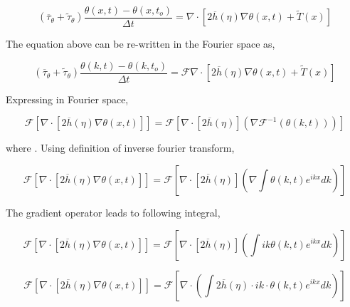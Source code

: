 \documentclass[a4paper,11pt,dvipsnames]{article}
\begin{document}
\begin{equation}
\left ( \overline{\tau}_\theta + \tilde{\tau}_\theta \right ) \frac{\theta (x,t) - \theta (x,t_o)}{\Delta t} = \nabla \cdot \left [ 2 \overline{h}(\eta) \nabla \theta (x,t) + \tilde{T} (x) \right ] \label{eq:3}
\end{equation}

The equation above can be re-written in the Fourier space as,

\begin{equation}
\left ( \overline{\tau}_\theta + \tilde{\tau}_\theta \right ) \frac{\theta (k,t) - \theta (k,t_o)}{\Delta t} = \mathcal{F} \nabla \cdot \left [ 2 \overline{h}(\eta) \nabla \theta (x,t) + \tilde{T} (x) \right ] \label{eq:4}
\end{equation}

Expressing  in Fourier space,  

\begin{equation}
\mathcal{F} \left [ \nabla \cdot \left [ 2 \overline{h}(\eta) \nabla \theta (x,t) \right ] \right ] = 
\mathcal{F} \left [ \nabla \cdot \left [ 2 \overline{h}(\eta) \right ] \left ( \nabla \mathcal{F}^{-1} \left (\theta (k,t) \right ) \right ) \right ] \label{eq:5}
\end{equation}

where . 
Using definition of inverse fourier transform, 

\begin{equation}
\mathcal{F} \left [ \nabla \cdot \left [ 2 \overline{h}(\eta) \nabla \theta (x,t) \right ] \right ] = 
\mathcal{F} \left [ \nabla \cdot \left [ 2 \overline{h}(\eta) \right ] \left ( \nabla \int \theta (k,t) e^{ikx} dk \right ) \right ] \label{eq:6}
\end{equation}

The gradient operator leads to following integral, 

\begin{equation}
\mathcal{F} \left [ \nabla \cdot \left [ 2 \overline{h}(\eta) \nabla \theta (x,t) \right ] \right ] = 
\mathcal{F} \left [ \nabla \cdot \left [ 2 \overline{h}(\eta) \right ] \left ( \int ik \theta (k,t) e^{ikx} dk \right ) \right ] \label{eq:7}
\end{equation}

\begin{equation}
\mathcal{F} \left [ \nabla \cdot \left [ 2 \overline{h}(\eta) \nabla \theta (x,t) \right ] \right ] = 
\mathcal{F} \left [ \nabla \cdot \left ( \int 2 \overline{h} (\eta) \cdot ik \cdot \theta (k,t) e^{ikx} dk \right ) \right ] \label{eq:8}
\end{equation}
\end{document}
